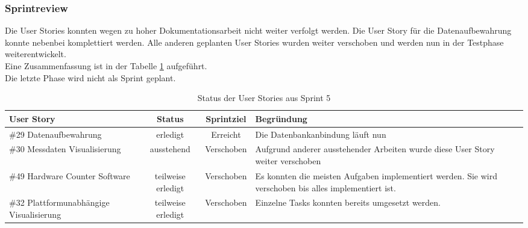 \subsubsection*{Sprintreview}
Die User Stories konnten wegen zu hoher Dokumentationsarbeit nicht weiter verfolgt werden. Die User Story für die Datenaufbewahrung konnte nebenbei komplettiert werden. Alle anderen geplanten User Stories wurden weiter verschoben und werden nun in der Testphase weiterentwickelt.\\
Eine Zusammenfassung ist in der Tabelle \ref{tab:sprint5} aufgeführt.\\
Die letzte Phase wird nicht als Sprint geplant.
\begin{table}[H]
    \centering
    \begin{tabular}{p{4cm}ccp{7cm}}
        \textbf{User Story} &  \textbf{Status} & \textbf{Sprintziel}& \textbf{Begründung}\\\toprule[2pt]
        \#29 Datenaufbewahrung & erledigt & Erreicht & Die Datenbankanbindung läuft nun\\
        \#30 Messdaten Visualisierung & ausstehend & Verschoben & Aufgrund anderer ausstehender Arbeiten wurde diese User Story weiter verschoben\\
        \#49 Hardware Counter Software & teilweise erledigt & Verschoben & Es konnten die meisten Aufgaben implementiert werden. Sie wird verschoben bis alles implementiert ist.\\
        \#32 Plattformunabhängige Visualisierung & teilweise erledigt & Verschoben & Einzelne Tasks konnten bereits umgesetzt werden.\\
    \end{tabular}
    \caption{Status der User Stories aus Sprint 5}
    \label{tab:sprint5}
\end{table}